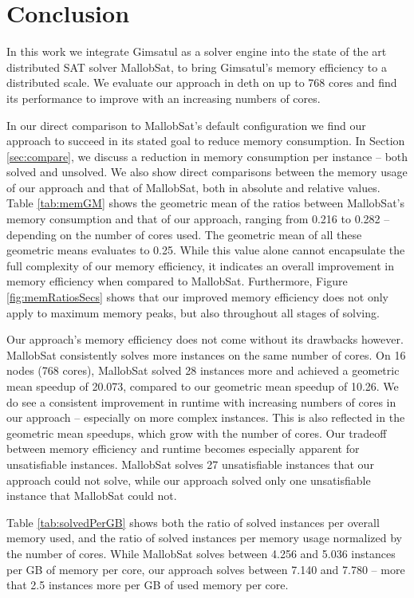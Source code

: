 \documentclass[12pt,a4paper,twoside]{scrartcl}
\numberwithin{equation}{section}
\begin{document}
\clearpage
\newpage
\section{Conclusion}
\label{sec:conclusion}

In this work we integrate Gimsatul as a solver engine into the state of the art distributed SAT solver MallobSat, to bring Gimsatul's memory efficiency to a distributed scale. We evaluate our approach in deth on up to 768 cores and find its performance to improve with an increasing numbers of cores.

In our direct comparison to MallobSat's default configuration we find our approach to succeed in its stated goal to reduce memory consumption. In Section \ref{sec:compare}, we discuss a reduction in memory consumption per instance -- both solved and unsolved. We also show direct comparisons between the memory usage of our approach and that of MallobSat, both in absolute and relative values. Table \ref{tab:memGM} shows the geometric mean of the ratios between MallobSat's memory consumption and that of our approach, ranging from 0.216 to 0.282 -- depending on the number of cores used. The geometric mean of all these geometric means evaluates to 0.25. While this value alone cannot encapsulate the full complexity of our memory efficiency, it indicates an overall improvement in memory efficiency when compared to MallobSat. Furthermore, Figure \ref{fig:memRatiosSecs} shows that our improved memory efficiency does not only apply to maximum memory peaks, but also throughout all stages of solving.

Our approach's memory efficiency does not come without its drawbacks however. MallobSat consistently solves more instances on the same number of cores. On 16 nodes (768 cores), MallobSat solved 28 instances more and achieved a geometric mean speedup of 20.073, compared to our geometric mean speedup of 10.26. We do see a consistent improvement in runtime with increasing numbers of cores in our approach -- especially on more complex instances. This is also reflected in the geometric mean speedups, which grow with the number of cores. Our tradeoff between memory efficiency and runtime becomes especially apparent for unsatisfiable instances. MallobSat solves 27 unsatisfiable instances that our approach could not solve, while our approach solved only one unsatisfiable instance that MallobSat could not.

Table \ref{tab:solvedPerGB} shows both the ratio of solved instances per overall memory used, and the ratio of solved instances per memory usage normalized by the number of cores. While MallobSat solves between 4.256 and 5.036 instances per GB of memory per core, our approach solves between 7.140 and 7.780 -- more that 2.5 instances more per GB of used memory per core.
\end{document}
